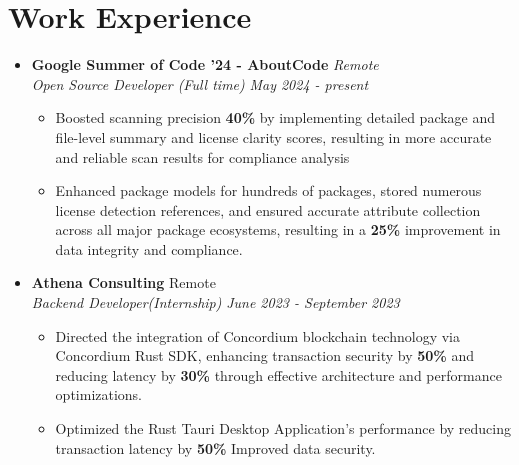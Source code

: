 \documentclass[legalpaper,10.5pt]{article}
\begin{document}
\section{Work Experience}
\begin{itemize}[leftmargin=*]

\item \textbf{Google Summer of Code '24 - AboutCode}  \hfill \textit{Remote} \\
\textit{Open Source Developer (Full time)}  \hfill \textit{May 2024 - present}
\begin{itemize}[label=$\diamond$]
    \item \small Boosted scanning precision \textbf{40\%} by implementing detailed package and file-level summary and license clarity scores, resulting in more accurate and reliable scan results for compliance analysis
    \item Enhanced package models for hundreds of packages, stored numerous license detection references, and ensured accurate attribute collection across all major package ecosystems, resulting in a \textbf{25\%} improvement in data integrity and compliance.

\end{itemize}

\item \textbf {Athena Consulting} \hfill Remote \\[3.75pt]
\textit{Backend Developer(Internship)} \hfill \textit{June 2023 - September 2023}
\begin{itemize}[label=$\diamond$]
    \item \small Directed the integration of Concordium blockchain technology via Concordium Rust SDK, enhancing transaction security by \textbf{50\%} and reducing latency by \textbf{30\%} through effective architecture and performance optimizations.
    \item \small Optimized the Rust Tauri Desktop Application's performance by reducing transaction latency by \textbf{50\%} Improved data security.
\end{itemize}
\end{itemize}
\end{document}
